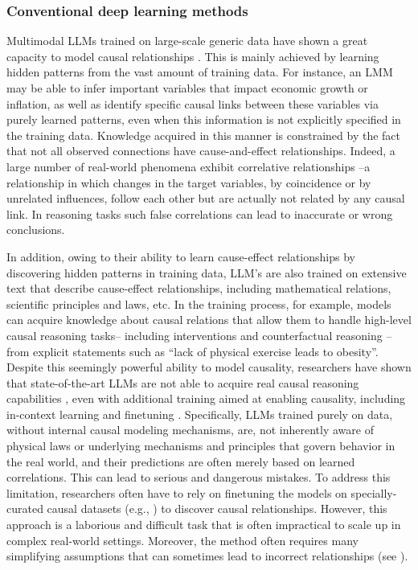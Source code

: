 \documentclass[10pt,journal,compsoc]{IEEEtran}
\begin{document}
	\subsubsection{Conventional deep learning methods}
	Multimodal LLMs trained on large-scale generic data have shown a great capacity to model causal relationships \cite{willig2023probing,kiciman2023causal}. This is mainly achieved by learning hidden patterns from the vast amount of training data. For instance, an LMM may be able to infer important variables that impact economic growth or inflation, as well as identify specific causal links between these variables via purely learned patterns, even when this information is not explicitly specified in the training data.  Knowledge acquired in this manner is constrained by the fact that not all observed connections have cause-and-effect relationships. Indeed, a large number of real-world phenomena exhibit correlative relationships \cite{marwala2015causality,stapp1976correlation} –a relationship in which changes in the target variables, by coincidence or by unrelated influences, follow each other but are actually not related by any causal link. In reasoning tasks such false correlations can lead to inaccurate or wrong conclusions. 
	
	In addition, owing to their ability to learn cause-effect relationships by discovering hidden patterns in training data, LLM’s are also trained on extensive text that describe cause-effect relationships, including mathematical relations, scientific principles and laws, etc. In the training process, for example, models can acquire knowledge about causal relations that allow them to handle high-level causal reasoning tasks– including interventions \cite{jin2023cladder,zhang2024if,zhang2022rock} and counterfactual reasoning \cite{feder2024causal,liu2023magic,zhang2024if,chen2022disco,zhang2023towards,li2023prompting} – from explicit statements such as “lack of physical exercise leads to obesity”.  Despite this seemingly powerful ability to model causality, researchers have shown that state-of-the-art LLMs are not able to acquire real causal reasoning capabilities \cite{zevcevic2023causal,koch2023babbling,wu2024causality}, even with additional training aimed at enabling causality, including in-context learning and finetuning \cite{jin2023can}. Specifically, LLMs trained purely on data, without internal causal modeling mechanisms, are, not inherently aware of physical laws or underlying mechanisms and principles that govern behavior in the real world, and their predictions are often merely based on learned correlations. This can lead to serious and dangerous mistakes. To address this limitation, researchers often have to rely on finetuning the models on specially-curated causal datasets (e.g., \cite{du2022care,dalal2023calm}) to discover causal relationships. However, this approach is a laborious and difficult task that is often impractical to scale up in complex real-world settings. Moreover, the method often requires many simplifying assumptions that can sometimes lead to incorrect relationships (see \cite{rawal2024causality,glymour2019review}).
	
\end{document}
